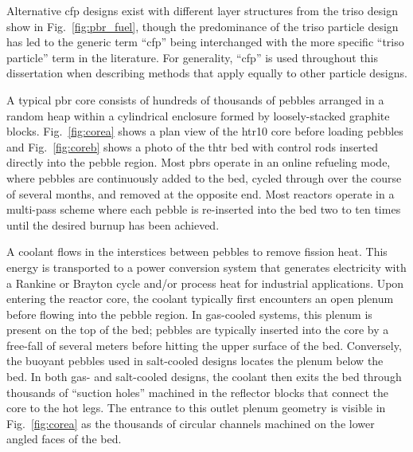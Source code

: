 Alternative \gls{cfp} designs exist with different layer structures from the \gls{triso} design show in Fig.\ \ref{fig:pbr_fuel}, though the predominance of the \gls{triso} particle design has led to the generic term ``\gls{cfp}'' being interchanged with the more specific ``\gls{triso} particle'' term in the literature. For generality, ``\gls{cfp}'' is used throughout this dissertation when describing methods that apply equally to other particle designs.

A typical \gls{pbr} core consists of hundreds of thousands of pebbles arranged in a random heap within a cylindrical enclosure formed by loosely-stacked graphite blocks. Fig.\ \ref{fig:corea} shows a plan view of the \gls{htr10} core before loading pebbles and Fig.\ \ref{fig:coreb} shows a photo of the \gls{thtr} bed with control rods inserted directly into the pebble region. Most \glspl{pbr} operate in an online refueling mode, where pebbles are continuously added to the bed, cycled through over the course of several months, and removed at the opposite end. Most reactors operate in a multi-pass scheme where each pebble is re-inserted into the bed two to ten times until the desired burnup has been achieved.

A coolant flows in the interstices between pebbles to remove fission heat. This energy is transported to a power conversion system that generates electricity with a Rankine or Brayton cycle and/or process heat for industrial applications. Upon entering the reactor core, the coolant typically first encounters an open plenum before flowing into the pebble region. In gas-cooled systems, this plenum is present on the top of the bed; pebbles are typically inserted into the core by a free-fall of several meters before hitting the upper surface of the bed. Conversely, the buoyant pebbles used in salt-cooled designs locates the plenum below the bed. In both gas- and salt-cooled designs, the coolant then exits the bed through thousands of ``suction holes'' machined in the reflector blocks that connect the core to the hot legs. The entrance to this outlet plenum geometry is visible in Fig.\ \ref{fig:corea} as the thousands of circular channels machined on the lower angled faces of the bed.

